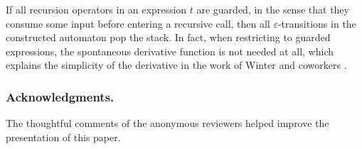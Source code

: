 \documentclass[runningheads, envcountsame, a4paper]{llncs}
\begin{document}
If all recursion operators in an expression $t$ are guarded, in the
sense that they consume some input before entering a recursive call,
then all $\varepsilon$-transitions in the constructed automaton pop
the stack. In fact, when restricting to guarded expressions, the
spontaneous derivative function is not needed at all, which explains
the simplicity of the derivative in the work of Winter and coworkers \cite{DBLP:conf/calco/WinterBR11}.

\subsubsection*{Acknowledgments.} The thoughtful comments of the
anonymous reviewers helped improve the presentation of this paper.
\clearpage


\clearpage
\appendix{}
\end{document}
